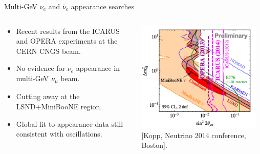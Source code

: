 \begin{frame}[t]{Multi-GeV $\nu_{e}$ and $\bar{\nu}_{e}$ appearance searches}

\begin{columns}
  \begin{column}{0.40\textwidth}
    \begin{itemize}
      \item Recent results from the ICARUS and OPERA experiments at the CERN CNGS beam.
      \item No evidence for $\nu_{e}$ appearance in multi-GeV $\nu_{\mu}$ beam.
      \item Cutting away at the LSND+MiniBooNE region.
      \item Global fit to appearance data still consistent with oscillations.
    \end{itemize}
  \end{column}
  \begin{column}{0.60\textwidth}
    \includegraphics[width=0.95\textwidth]{./images/beyond3nu/pheno/kopp_global_app_withcngs.png}\\
    {\color{blue}[Kopp, Neutrino 2014 conference, Boston]}.
  \end{column}
\end{columns}
\end{frame}

%
%
%

